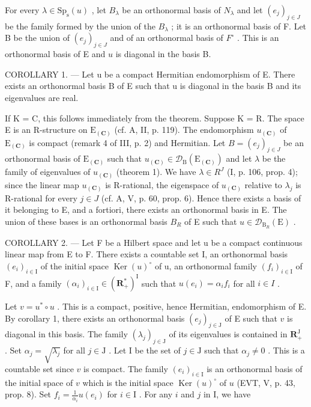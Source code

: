 For every \(\lambda \in \mathrm{Sp}_{\mathrm{s}}(u)\) , let \(B_{\lambda}\) be an orthonormal basis of \(N_{\lambda}\) and let \((e_j)_{j \in J}\) be the family formed by the union of the \(B_{\lambda}\) ; it is an orthonormal basis of F. Let B be the union of \((e_j)_{j \in J}\) and of an orthonormal basis of \(F^{\circ}\) . This is an orthonormal basis of E and \(u\) is diagonal in the basis B.

COROLLARY 1. --- Let u be a compact Hermitian endomorphism of E. There exists an orthonormal basis B of E such that u is diagonal in the basis B and its eigenvalues are real.

If K = C, this follows immediately from the theorem. Suppose K = R. The space E is an R-structure on \(\mathrm{E}_{(\mathbf{C})}\) (cf. A, II, p. 119). The endomorphism \(u_{(\mathbf{C})}\) of \(\mathrm{E}_{(\mathbf{C})}\) is compact (remark 4 of III, p. 2) and Hermitian. Let \(B = (e_j)_{j \in J}\) be an orthonormal basis of \(\mathrm{E}_{(\mathbf{C})}\) such that \(u_{(\mathbf{C})} \in \mathcal{D}_{\mathrm{B}}(\mathrm{E}_{(\mathbf{C})})\) and let \(\lambda\) be the family of eigenvalues of \(u_{(\mathbf{C})}\) (theorem 1). We have \(\lambda \in R^{J}\) (I, p. 106, prop. 4); since the linear map \(u_{(\mathbf{C})}\) is R-rational, the eigenspace of \(u_{(\mathbf{C})}\) relative to \(\lambda_j\) is R-rational for every \(j \in J\) (cf. A, V, p. 60, prop. 6). Hence there exists a basis of it belonging to E, and a fortiori, there exists an orthonormal basis in E. The union of these bases is an orthonormal basis \(B_R\) of E such that \(u \in \mathcal{D}_{\mathrm{B}_R}(\mathrm{E})\) .

COROLLARY 2. --- Let F be a Hilbert space and let u be a compact continuous linear map from E to F. There exists a countable set I, an orthonormal basis \((e_{i})_{i\in\mathrm{I}}\) of the initial space \(\operatorname{Ker}(u)^{\circ}\) of u, an orthonormal family \((f_{i})_{i\in\mathrm{I}}\) of F, and a family \((\alpha_{i})_{i\in\mathrm{I}}\in(\mathbf{R}_{+}^{*})^{\mathrm{I}}\) such that \(u(e_{i})=\alpha_{i}f_{i}\) for all \(i\in I\) .

Let \(v = u^{*} \circ u\) . This is a compact, positive, hence Hermitian, endomorphism of E. By corollary 1, there exists an orthonormal basis \((e_{j})_{j \in \mathrm{J}}\) of E such that \(v\) is diagonal in this basis. The family \((\lambda_{j})_{j \in \mathrm{J}}\) of its eigenvalues is contained in \(\mathbf{R}_{+}^{\mathrm{J}}\) . Set \(\alpha_{j} = \sqrt{\lambda_{j}}\) for all \(j \in \mathrm{J}\) . Let I be the set of \(j \in \mathrm{J}\) such that \(\alpha_{j} \neq 0\) . This is a countable set since \(v\) is compact. The family \((e_{i})_{i \in \mathrm{I}}\) is an orthonormal basis of the initial space of \(v\) which is the initial space \(\operatorname{Ker}(u)^{\circ}\) of \(u\) (EVT, V, p. 43, prop. 8). Set \(f_{i} = \frac{1}{\alpha_{i}} u(e_{i})\) for \(i\in \mathrm{I}\) . For any \(i\) and \(j\) in I, we have

